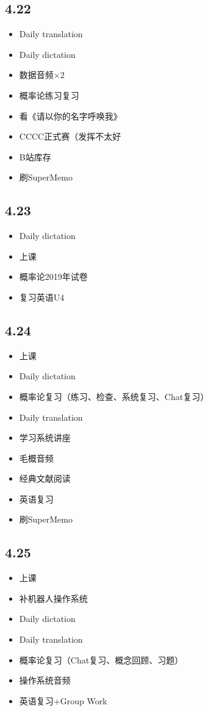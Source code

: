 \documentclass[UTF8]{ctexart}
\begin{document}
\subsection*{4.22}
\begin{itemize}
    \item Daily translation
    \item Daily dictation
    \item 数据音频$\times 2$
    \item 概率论练习复习
    \item 看《请以你的名字呼唤我》
    \item CCCC正式赛（发挥不太好
    \item B站库存
    \item 刷SuperMemo
\end{itemize}
\subsection*{4.23}
\begin{itemize}
    \item Daily dictation
    \item 上课
    \item 概率论2019年试卷
    \item 复习英语U4
\end{itemize}
\subsection*{4.24}
\begin{itemize}
    \item 上课
    \item Daily dictation
    \item 概率论复习（练习、检查、系统复习、Chat复习）
    \item Daily translation
    \item 学习系统讲座
    \item 毛概音频
    \item 经典文献阅读
    \item 英语复习
    \item 刷SuperMemo
\end{itemize}
\subsection*{4.25}
\begin{itemize}
    \item 上课
    \item 补机器人操作系统
    \item Daily dictation
    \item Daily translation
    \item 概率论复习（Chat复习、概念回顾、习题）
    \item 操作系统音频
    \item 英语复习+Group Work
\end{itemize}
\end{document}
